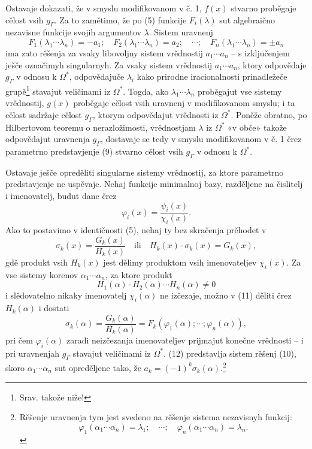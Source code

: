 \documentclass[11pt]{article}
\begin{document}
Ostavaje dokazati, že v smyslu modifikovanom v č. 1, $f(x)$ stvarno proběgaje cělost vsih $g_\Gamma$. Za to zamětimo, že po (5) funkcije $F_i(\lambda)$ sut algebraično nezavisne funkcije svojih argumentov $\lambda$. Sistem uravnenj
\begin{equation}
F_1(\lambda_1\cdots\lambda_n)=-a_1;\quad F_2(\lambda_1\cdots\lambda_n)=a_2;\quad \cdots;\quad F_n(\lambda_1\cdots\lambda_n)=\pm a_n
\tag{10}
\end{equation}
ima zato rěšenja za vsaky libovoljny sistem vrědnostij $a_1\cdots a_n$ -- s izključenjem ješče označimyh singularnyh. Za vsaky sistem vrědnostij $a_1\cdots a_n$, ktory odpovědaje $g_\Gamma$ v odnosu k $\Omega^*$, odpovědajuče $\lambda_i$ kako prirodne iracionalnosti prinadležeče grupě\footnote{Srav. takože niže!} stavajut veličinami iz $\Omega^*$. Togda, ako $\lambda_1\cdots\lambda_n$ proběgajut vse sistemy vrědnostij, $g(x)$ proběgaje cělost vsih uravnenj v modifikovanom smyslu; i ta cělost sadržaje cělost $g_\Gamma$, ktorym odpovědajut vrědnosti iz $\Omega^*$. Poněže obratno, po Hilbertovom teoremu o nerazložimosti, vrědnostjam $\lambda$ iz $\Omega^*$ «v obče» takože odpovědajut uravnenja $g_\Gamma$, dostavaje se tedy v smyslu modifikovanom v č. 1 črez parametrno predstavjenje (9) stvarno cělost vsih $g_\Gamma$ v odnosu k $\Omega^*$.

Ostavaje ješče opreděliti singularne sistemy vrědnostij, za ktore parametrno predstavjenje ne uspěvaje. Nehaj funkcije minimalnoj bazy, razděljene na čislitelj i imenovatelj, budut dane črez
\[
\varphi_i(x)=\frac{\psi_i(x)}{\chi_i(x)}.
\]
Ako to postavimo v identičnosti (5), nehaj ty bez skračenja prěhodet v
\begin{equation}
\sigma_k(x)=\frac{G_k(x)}{H_k(x)}\quad\text{ili}\quad H_k(x)\cdot\sigma_k(x)=G_k(x),
\tag{11}
\end{equation}
gdě produkt vsih $H_k(x)$ jest dělimy produktom vsih imenovateljev $\chi_i(x)$. Za vse sistemy korenov $\alpha_1\cdots\alpha_n$, za ktore produkt
\[
H_1(\alpha)\cdot H_2(\alpha)\cdots H_n(\alpha)\neq0
\]
i slědovatelno nikaky imenovatelj $\chi_i(\alpha)$ ne izčezaje, možno v (11) děliti črez $H_k(\alpha)$ i dostati
\begin{equation}
\sigma_k(\alpha)=\frac{G_k(\alpha)}{H_k(\alpha)}=F_k(\varphi_1(\alpha);\cdots;\varphi_n(\alpha)),
\tag{12}
\end{equation}
pri čem $\varphi_i(\alpha)$ zaradi neizčezanja imenovateljev prijmajut konečne vrědnosti -- i pri uravnenjah $g_\Gamma$ stavajut veličinami iz $\Omega^*$. (12) predstavlja sistem rěšenj (10), skoro $\alpha_1\cdots\alpha_n$ sut opreděljene tako, že $a_k=(-1)^k\sigma_k(\alpha)$.\footnote{Rěšenje uravnenja tym jest svedeno na rěšenje sistema nezavisnyh funkcij:
\[
\varphi_1(\alpha_1\cdots\alpha_n)=\lambda_1;\quad \cdots;\quad \varphi_n(\alpha_1\cdots\alpha_n)=\lambda_n.
\]}
\end{document}
